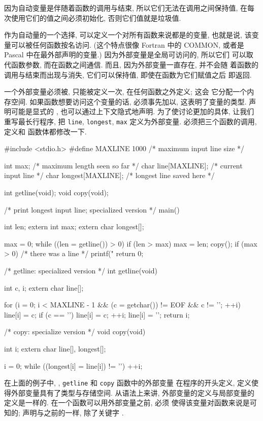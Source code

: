 因为自动变量是伴随着函数的调用与结束, 所以它们无法在调用之间保持值, 在每
次使用它们的值之间必须初始化, 否则它们值就是垃圾值.

作为自动量的一个选择, 可以定义一个对所有函数来说都是的变量,
也就是说, 该变量可以被任何函数按名访问. (这个特点很像 Fortran 中的 COMMON,
或者是 Pascal 中在最外部声明的变量.) 因为外部变量是全局可访问的, 所以它们 
可以取代函数参数, 而在函数之间通信. 而且, 因为外部变量一直存在, 并不会随
着函数的调用与结束而出现与消失, 它们可以保持值, 即使在函数为它们赋值之后
即返回.

一个外部变量必须被, 只能被定义一次, 在任何函数之外定义; 这会
它分配一个内存空间. 如果函数想要访问这个变量的话, 必须事先加以,
这表明了变量的类型. 声明可能是显式的 \cextern, 也可以通过上下文隐式地声明.
为了使讨论更加的具体, 让我们重写最长行程序, 把 \texttt{line},
\texttt{longest}, \texttt{max} 定义为外部变量. 必须把三个函数的调用, 定义和
函数体都修改一下.
\begin{myverbatim}
    #include <stdio.h>
    #define MAXLINE 1000    /* maximum input line size */

    int max;                /* maximum length seen so far */
    char line[MAXLINE];     /* current input line */
    char longest[MAXLINE];  /* longest line saved here */

    int getline(void);
    void copy(void);

    /* print longest input line; specialized version */
    main()
    {
        int len;
        extern int max;
        extern char longest[];

        max = 0;
        while ((len = getline()) > 0)
            if (len > max) {
                max = len;
                copy();
            }
        if (max > 0) /* there was a line */
            printf("%
        return 0;
    }

    /* getline: specialized version */
    int getline(void)
    {
        int c, i;
        extern char line[];

        for (i = 0; i < MAXLINE - 1
                && (c = getchar()) != EOF 
                && c != '\n'; ++i)
            line[i] = c;
        if (c == '\n') {
            line[i] = c;
            ++i;
        }
        line[i] = '\0';
        return i;
    }

    /* copy: specialize version */
    void copy(void)
    {
        int i;
        extern char line[], longest[];

        i = 0;
        while ((longest[i] = line[i]) != '\0')
            ++i;
    }
\end{myverbatim}
在上面的例子中, \cmain, \texttt{getline} 和 \texttt{copy} 函数中的外部变量
在程序的开头定义, 定义使得外部变量具有了类型与存储空间. 从语法上来讲,
外部变量的定义与局部变量的定义是一样的. 在一个函数可以用外部变量之前, 必须 
使得该变量对函数来说是可知的; 声明与之前的一样, 除了关键字 \cextern.

